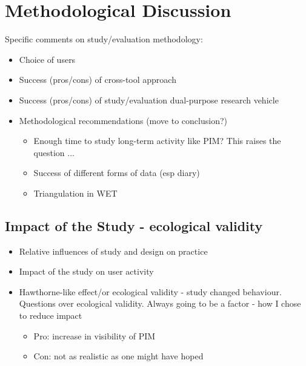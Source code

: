 	
\section{Methodological Discussion}
\label{ch7:methodological-discussion}

Specific comments on study/evaluation methodology:
\begin{itemize}
	\item Choice of users
	
	\item Success (pros/cons) of cross-tool approach
	
	\item Success (pros/cons) of study/evaluation dual-purpose research vehicle
	
	\item Methodological recommendations (move to conclusion?)
	\begin{itemize}
		\item Enough time to study long-term activity like PIM? This raises the question ...
		\item Success of different forms of data (esp diary)
		\item Triangulation in WET
	\end{itemize}

\end{itemize}

\subsection{Impact of the Study - ecological validity}
	\begin{itemize}
		\item Relative influences of study and design on practice
		\item Impact of the study on user activity
		\item Hawthorne-like effect/or ecological validity - study changed behaviour. Questions over ecological validity. Always going to be a factor - how I chose to reduce impact
		\begin{itemize}
			\item Pro: increase in visibility of PIM
			\item Con: not as realistic as one might have hoped
		\end{itemize}
	\end{itemize}




